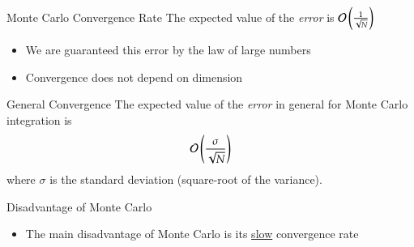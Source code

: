 \documentclass[10pt]{beamer}
\begin{document}
\begin{frame}{Monte Carlo Convergence Rate}
The expected value of the \emph{error} is ${\mathcal{O}}\left(\frac{1}{\sqrt{N}}\right)$
\begin{itemize}
  \item We are guaranteed this error by the law of large numbers
  \item Convergence does not depend on dimension
\end{itemize}
\bigskip 

\begin{block}{General Convergence}
The expected value of the \emph{error} in general for Monte Carlo integration is
   $${\mathcal{O}}\left(\frac{\sigma}{\sqrt{N}}\right)$$ where $\sigma$ is the standard
   deviation (square-root of the variance).
\end{block}
\end{frame}
\begin{frame}{Disadvantage of Monte Carlo}
\begin{center}
\end{center}

\begin{itemize}
    \item The main disadvantage of Monte Carlo is its \underline{slow} convergence rate
\end{itemize}
\end{frame}


\end{document}
